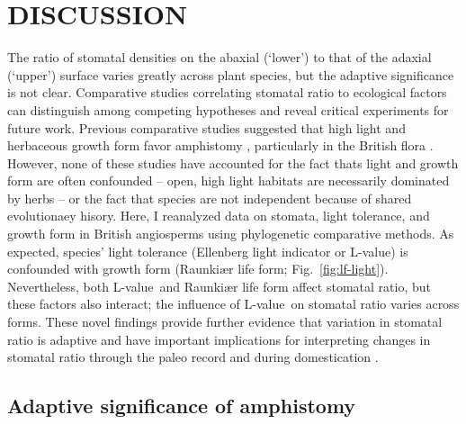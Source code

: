 \documentclass[12pt, oneside]{article}
\newcommand{\el}{L-value}
\begin{document}


\section*{DISCUSSION}

The ratio of stomatal densities on the abaxial (`lower') to that of the adaxial (`upper') surface varies greatly across plant species, but the adaptive significance is not clear. Comparative studies correlating stomatal ratio to ecological factors can distinguish among competing hypotheses and reveal critical experiments for future work. Previous comparative studies suggested that high light and herbaceous growth form favor amphistomy \citep{Mott_etal_1982, Jordan_etal_2014, Muir_2015, Bucher_etal_2017}, particularly in the British flora \citep{Salisbury_1927, Peat_Fitter_1994b}. However, none of these studies have accounted for the fact thats light and growth form are often confounded -- open, high light habitats are necessarily dominated by herbs -- or the fact that species are not independent because of shared evolutionaey hisory. Here, I reanalyzed data on stomata, light tolerance, and growth form in British angiosperms using phylogenetic comparative methods. As expected, species' light tolerance (Ellenberg light indicator or \el) is confounded with growth form (Raunki\ae r life form; Fig.~\ref{fig:lf-light}). Nevertheless, both \el~and Raunki\ae r life form affect stomatal ratio, but these factors also interact; the influence of \el~on stomatal ratio varies across forms. These novel findings provide further evidence that variation in stomatal ratio is adaptive and have important implications for interpreting changes in stomatal ratio through the paleo record \citep{Jordan_etal_2014} and during domestication \citep{Milla_etal_2013}.

\subsection*{Adaptive significance of amphistomy}
\end{document}
